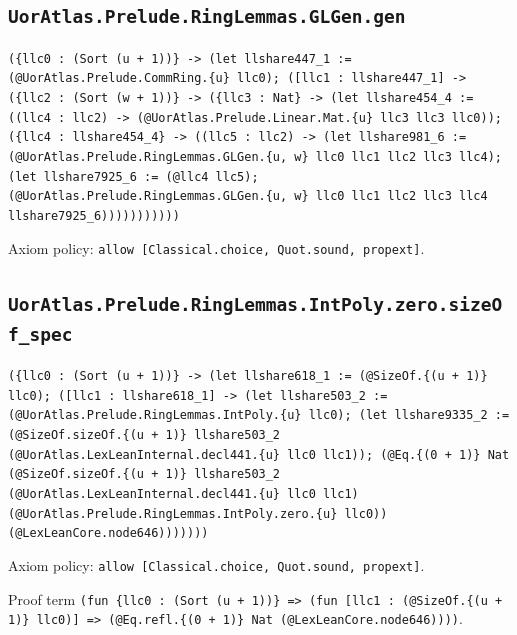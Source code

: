 \documentclass[11pt]{article}
\begin{document}
\subsection*{\texttt{UorAtlas.Prelude.RingLemmas.GLGen.gen}}
\noindent\texttt{(\{llc0 : (Sort (u + 1))\} -> (let llshare447\_1 := (@UorAtlas.Prelude.CommRing.\{u\} llc0); ([llc1 : llshare447\_1] -> (\{llc2 : (Sort (w + 1))\} -> (\{llc3 : Nat\} -> (let llshare454\_4 := ((llc4 : llc2) -> (@UorAtlas.Prelude.Linear.Mat.\{u\} llc3 llc3 llc0)); (\{llc4 : llshare454\_4\} -> ((llc5 : llc2) -> (let llshare981\_6 := (@UorAtlas.Prelude.RingLemmas.GLGen.\{u, w\} llc0 llc1 llc2 llc3 llc4); (let llshare7925\_6 := (@llc4 llc5); (@UorAtlas.Prelude.RingLemmas.GLGen.\{u, w\} llc0 llc1 llc2 llc3 llc4 llshare7925\_6)))))))))))}\par
\noindent Axiom policy: \texttt{allow [Classical.choice, Quot.sound, propext]}.\par
\subsection*{\texttt{UorAtlas.Prelude.RingLemmas.IntPoly.zero.sizeOf\_spec}}
\noindent\texttt{(\{llc0 : (Sort (u + 1))\} -> (let llshare618\_1 := (@SizeOf.\{(u + 1)\} llc0); ([llc1 : llshare618\_1] -> (let llshare503\_2 := (@UorAtlas.Prelude.RingLemmas.IntPoly.\{u\} llc0); (let llshare9335\_2 := (@SizeOf.sizeOf.\{(u + 1)\} llshare503\_2 (@UorAtlas.LexLeanInternal.decl441.\{u\} llc0 llc1)); (@Eq.\{(0 + 1)\} Nat (@SizeOf.sizeOf.\{(u + 1)\} llshare503\_2 (@UorAtlas.LexLeanInternal.decl441.\{u\} llc0 llc1) (@UorAtlas.Prelude.RingLemmas.IntPoly.zero.\{u\} llc0)) (@LexLeanCore.node646)))))))}\par
\noindent Axiom policy: \texttt{allow [Classical.choice, Quot.sound, propext]}.\par
\noindent Proof term \texttt{(fun \{llc0 : (Sort (u + 1))\} => (fun [llc1 : (@SizeOf.\{(u + 1)\} llc0)] => (@Eq.refl.\{(0 + 1)\} Nat (@LexLeanCore.node646))))}.\par
\end{document}
